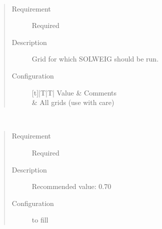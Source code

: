 \documentclass[letterpaper,10pt,english]{sphinxmanual}
\begin{document}
\begin{fulllineitems}
\label{\detokenize{input_files/SOLWEIG_input/SOLWEIGinput:cmdoption-arg-runforgrid}}~\begin{quote}\begin{description}
\item[{Requirement}] \leavevmode
Required

\item[{Description}] \leavevmode
Grid for which SOLWEIG should be run.

\item[{Configuration}] \leavevmode

\begin{savenotes}\sphinxattablestart
\centering
\begin{tabulary}{\linewidth}[t]{|T|T|}
\hline
\sphinxstyletheadfamily 
Value
&\sphinxstyletheadfamily 
Comments
\\
&
All grids (use with care)
\\
\hline
\end{tabulary}
\par
\sphinxattableend\end{savenotes}

\end{description}\end{quote}

\end{fulllineitems}


\begin{fulllineitems}
\label{\detokenize{input_files/SOLWEIG_input/SOLWEIGinput:cmdoption-arg-absk}}~\begin{quote}\begin{description}
\item[{Requirement}] \leavevmode
Required

\item[{Description}] \leavevmode
Recommended value: 0.70

\item[{Configuration}] \leavevmode
to fill

\end{description}\end{quote}

\end{fulllineitems}
\end{document}
